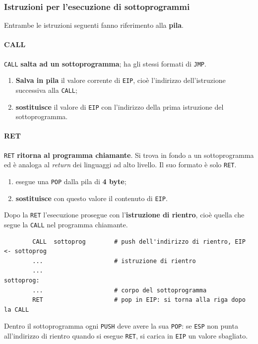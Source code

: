 \documentclass[11pt,a4paper]{article}
\begin{document}
\subsubsection*{Istruzioni per l'esecuzione di sottoprogrammi}

Entrambe le istruzioni seguenti fanno riferimento alla \textbf{pila}.

\paragraph*{CALL}

\texttt{CALL} \textbf{salta ad un sottoprogramma}; ha gli stessi formati di \texttt{JMP}.
\begin{enumerate}[leftmargin=*]
  \item \textbf{Salva in pila} il valore corrente di \texttt{EIP}, cioè l'indirizzo dell'istruzione successiva alla \texttt{CALL};
  \item \textbf{sostituisce} il valore di \texttt{EIP} con l'indirizzo della prima istruzione del sottoprogramma.
\end{enumerate}

\paragraph*{RET}

\texttt{RET} \textbf{ritorna al programma chiamante}. Si trova in fondo a un sottoprogramma ed è analoga al \emph{return} dei linguaggi ad alto livello. Il suo formato è solo \texttt{RET}.
\begin{enumerate}[leftmargin=*]
  \item esegue una \texttt{POP} dalla pila di \textbf{4 byte};
  \item \textbf{sostituisce} con questo valore il contenuto di \texttt{EIP}.
\end{enumerate}

Dopo la \texttt{RET} l'esecuzione prosegue con l'\textbf{istruzione di rientro}, cioè quella che segue la \texttt{CALL} nel programma chiamante.

\begin{integrazione}
\begin{lstlisting}
        CALL  sottoprog        # push dell'indirizzo di rientro, EIP <- sottoprog
        ...                    # istruzione di rientro
        ...
sottoprog:
        ...                    # corpo del sottoprogramma
        RET                    # pop in EIP: si torna alla riga dopo la CALL
\end{lstlisting}
Dentro il sottoprogramma ogni \texttt{PUSH} deve avere la sua \texttt{POP}: se \texttt{ESP} non punta all'indirizzo di rientro quando si esegue \texttt{RET}, si carica in \texttt{EIP} un valore sbagliato.
\end{integrazione}
\end{document}

